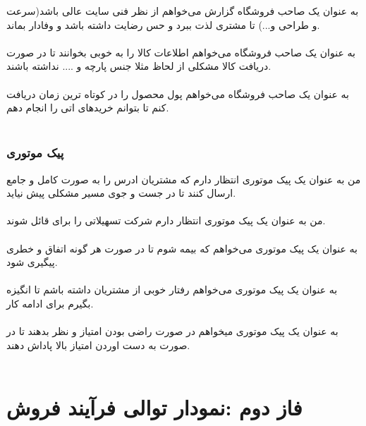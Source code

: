 \documentclass[12pt,onecolumn,a4paper]{article}
\begin{document}
به عنوان یک صاحب فروشگاه گزارش می‌خواهم از نظر فنی سایت عالی باشد(سرعت و طراحی و...) تا مشتری لذت ببرد و حس رضایت داشته باشد و وفادار بماند.\\
\\


به عنوان یک صاحب فروشگاه می‌خواهم اطلاعات کالا را به خوبی بخوانند تا در صورت دریافت کالا مشکلی از لحاظ مثلا جنس پارچه و .... نداشته باشند.\\
\\


به عنوان یک صاحب فروشگاه می‌خواهم پول محصول را در کوتاه ترین زمان دریافت کنم تا بتوانم خریدهای اتی را انجام دهم.\\
\\










\subsubsection{پیک موتوری}

  من به عنوان یک پیک موتوری انتظار دارم که مشتریان ادرس را به صورت کامل و جامع ارسال کنند تا در جست و جوی مسیر مشکلی پیش نیاید.\\
  \\


من به عنوان یک پیک موتوری انتظار دارم شرکت تسهیلاتی را برای قائل شوند.\\
\\


به عنوان یک پیک موتوری می‌خواهم که بیمه شوم تا در صورت هر گونه اتفاق و خطری پیگیری شود.\\
\\


به عنوان یک پیک موتوری می‌خواهم رفتار خوبی از مشتریان داشته باشم تا انگیزه بگیرم برای ادامه کار.\\
\\


به عنوان یک پیک موتوری میخواهم در صورت راضی بودن امتیاز و نظر بدهند تا در صورت به دست اوردن امتیاز بالا پاداش دهند.\\
\\



\section{فاز دوم :نمودار توالی فرآیند فروش}
\subsection{ }
\end{document}
